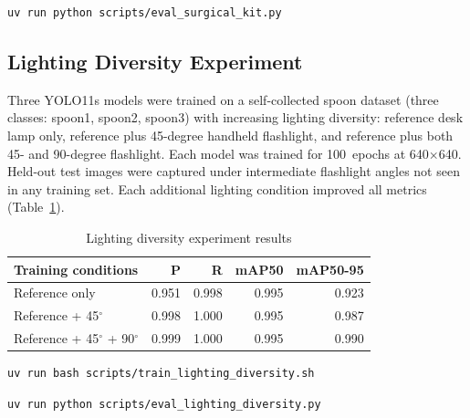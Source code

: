 \documentclass[10pt,a4paper]{article}
\begin{document}
\begin{lstlisting}[caption={Re-evaluate all surgical kit stages},label=lst:validate-surgical]
uv run python scripts/eval_surgical_kit.py
\end{lstlisting}

\subsection{Lighting Diversity Experiment}
\label{sec:appendix-c-lighting-diversity}

Three YOLO11s models were trained on a self-collected spoon dataset
(three classes: spoon1, spoon2, spoon3) with increasing lighting
diversity: reference desk lamp only, reference plus 45-degree handheld
flashlight, and reference plus both 45- and 90-degree flashlight.
Each model was trained for 100~epochs at 640$\times$640. Held-out test
images were captured under intermediate flashlight angles not seen in
any training set. Each additional lighting condition improved all
metrics (Table~\ref{tab:app-lighting-diversity}).

\begin{table}[H]
\centering
\caption{Lighting diversity experiment results}
\label{tab:app-lighting-diversity}
\small\renewcommand{\arraystretch}{1.2}\setlength{\tabcolsep}{4pt}
\begin{tabularx}{\textwidth}{lrrrr}
\hline
Training conditions & P & R & mAP50 & mAP50-95 \\
\hline
Reference only & 0.951 & 0.998 & 0.995 & 0.923 \\
Reference + 45$^\circ$ & 0.998 & 1.000 & 0.995 & 0.987 \\
Reference + 45$^\circ$ + 90$^\circ$ & 0.999 & 1.000 & 0.995 & 0.990 \\
\hline
\end{tabularx}
\end{table}

\begin{lstlisting}[caption={Train lighting diversity models},label=lst:train-lighting]
uv run bash scripts/train_lighting_diversity.sh
\end{lstlisting}

\begin{lstlisting}[caption={Re-evaluate lighting diversity models},label=lst:validate-lighting]
uv run python scripts/eval_lighting_diversity.py
\end{lstlisting}

\end{document}
